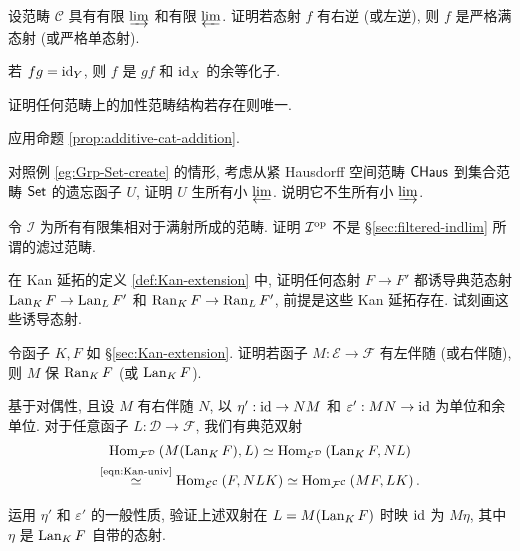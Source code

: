 \begin{Exercises}
	\item 设范畴 $\mathcal{C}$ 具有有限 $\varinjlim$ 和有限 $\varprojlim$. 证明若态射 $f$ 有右逆 (或左逆), 则 $f$ 是严格满态射 (或严格单态射).
	\begin{hint}
		若 $fg = \mathrm{id}_Y$, 则 $f$ 是 $gf$ 和 $\mathrm{id}_X$ 的余等化子.
	\end{hint}
	
	\item 证明任何范畴上的加性范畴结构若存在则唯一.
	\begin{hint}
		应用命题 \ref{prop:additive-cat-addition}.
	\end{hint}

	\item 对照例 \ref{eg:Grp-Set-create} 的情形, 考虑从紧 Hausdorff 空间范畴 $\mathsf{CHaus}$ 到集合范畴 $\mathsf{Set}$ 的遗忘函子 $U$, 证明 $U$ 生所有小 $\varprojlim$. 说明它不生所有小 $\varinjlim$.

	\item 令 $\mathcal{I}$ 为所有有限集相对于满射所成的范畴. 证明 $\mathcal{I}^{\operatorname{op}}$ 不是 \S\ref{sec:filtered-indlim} 所谓的滤过范畴.

	\item 在 Kan 延拓的定义 \ref{def:Kan-extension} 中, 证明任何态射 $F \to F'$ 都诱导典范态射 $\operatorname{Lan}_K F \to \operatorname{Lan}_L F'$ 和 $\operatorname{Ran}_K F \to \operatorname{Ran}_L F'$, 前提是这些 Kan 延拓存在. 试刻画这些诱导态射.

	\item 令函子 $K, F$ 如 \S\ref{sec:Kan-extension}. 证明若函子 $M: \mathcal{E} \to \mathcal{F}$ 有左伴随 (或右伴随), 则 $M$ 保 $\operatorname{Ran}_K F$ (或 $\operatorname{Lan}_K F$).

	\begin{hint}
		基于对偶性, 且设 $M$ 有右伴随 $N$, 以 $\eta': \mathrm{id} \to NM$ 和 $\varepsilon': MN \to \mathrm{id}$ 为单位和余单位. 对于任意函子 $L: \mathcal{D} \to \mathcal{F}$, 我们有典范双射
		\begin{multline*}
			\operatorname{Hom}_{\mathcal{F}^{\mathcal{D}}} \left( M (\operatorname{Lan}_K F) , L \right) \simeq \operatorname{Hom}_{\mathcal{E}^{\mathcal{D}}} \left( \operatorname{Lan}_K F, N L \right) \\
			\stackrel{\text{\eqref{eqn:Kan-univ}}}{\simeq} \operatorname{Hom}_{\mathcal{E}^{\mathcal{C}}} \left( F, NLK \right) \simeq \operatorname{Hom}_{\mathcal{F}^{\mathcal{C}}} \left( MF, LK \right).
		\end{multline*}
		
		运用 $\eta'$ 和 $\varepsilon'$ 的一般性质, 验证上述双射在 $L = M(\operatorname{Lan}_K F)$ 时映 $\mathrm{id}$ 为 $M\eta$, 其中 $\eta$ 是 $\operatorname{Lan}_K F$ 自带的态射.
		

\end{hint}
\end{Exercises}
